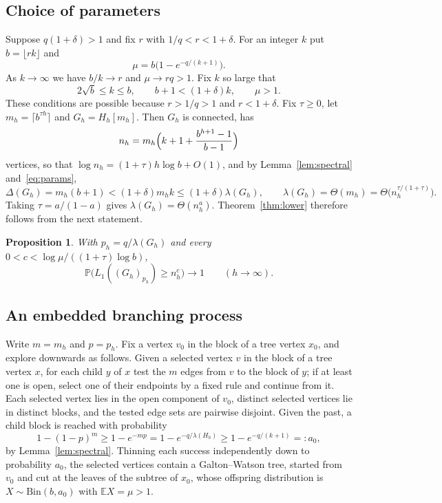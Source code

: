 \documentclass[11pt]{amsart}
\newtheorem{proposition}[theorem]{Proposition}
\theoremstyle{remark}
\newcommand{\PP}{\mathbb{P}}
\newcommand{\EE}{\mathbb{E}}
\begin{document}
\subsection{Choice of parameters}
Suppose $q(1+\delta)>1$ and fix $r$ with $1/q<r<1+\delta$. For an integer $k$ put $b=\lfloor rk\rfloor$ and
\[
\mu=b\bigl(1-e^{-q/(k+1)}\bigr).
\]
As $k\to\infty$ we have $b/k\to r$ and $\mu\to rq>1$. Fix $k$ so large that
\begin{equation}\label{eq:params}
2\sqrt b\le k\le b,\qquad b+1<(1+\delta)k,\qquad\mu>1.
\end{equation}
These conditions are possible because $r>1/q>1$ and $r<1+\delta$. Fix $\tau\ge0$, let $m_h=\lceil b^{\tau h}\rceil$ and
$G_h=H_h[m_h]$. Then $G_h$ is connected, has
\[
n_h=m_h\Bigl(k+1+\frac{b^{h+1}-1}{b-1}\Bigr)
\]
vertices, so that $\log n_h=(1+\tau)h\log b+O(1)$, and by Lemma~\ref{lem:spectral} and~\eqref{eq:params},
\[
\Delta(G_h)=m_h(b+1)<(1+\delta)m_hk\le(1+\delta)\lambda(G_h),\qquad\lambda(G_h)=\Theta(m_h)=\Theta\bigl(n_h^{\tau/(1+\tau)}\bigr).
\]
Taking $\tau=a/(1-a)$ gives $\lambda(G_h)=\Theta(n_h^a)$. Theorem~\ref{thm:lower} therefore follows from the next
statement.

\begin{proposition}\label{prop:lower}
With $p_h=q/\lambda(G_h)$ and every $0<c<\log\mu/((1+\tau)\log b)$,
\[
\PP\bigl(L_1((G_h)_{p_h})\ge n_h^c\bigr)\to1\qquad(h\to\infty).
\]
\end{proposition}

\subsection{An embedded branching process}
Write $m=m_h$ and $p=p_h$. Fix a vertex $v_0$ in the block of a tree vertex $x_0$, and explore downwards as follows.
Given a selected vertex $v$ in the block of a tree vertex $x$, for each child $y$ of $x$ test the $m$ edges from $v$ to
the block of $y$; if at least one is open, select one of their endpoints by a fixed rule and continue from it. Each
selected vertex lies in the open component of $v_0$, distinct selected vertices lie in distinct blocks, and the tested
edge sets are pairwise disjoint. Given the past, a child block is reached with probability
\begin{equation}\label{eq:success}
1-(1-p)^m\ge1-e^{-mp}=1-e^{-q/\lambda(H_h)}\ge1-e^{-q/(k+1)}=:a_0,
\end{equation}
by Lemma~\ref{lem:spectral}. Thinning each success independently down to probability $a_0$, the selected vertices
contain a Galton--Watson tree, started from $v_0$ and cut at the leaves of the subtree of $x_0$, whose offspring
distribution is $X\sim\mathrm{Bin}(b,a_0)$ with $\EE X=\mu>1$.
\end{document}
